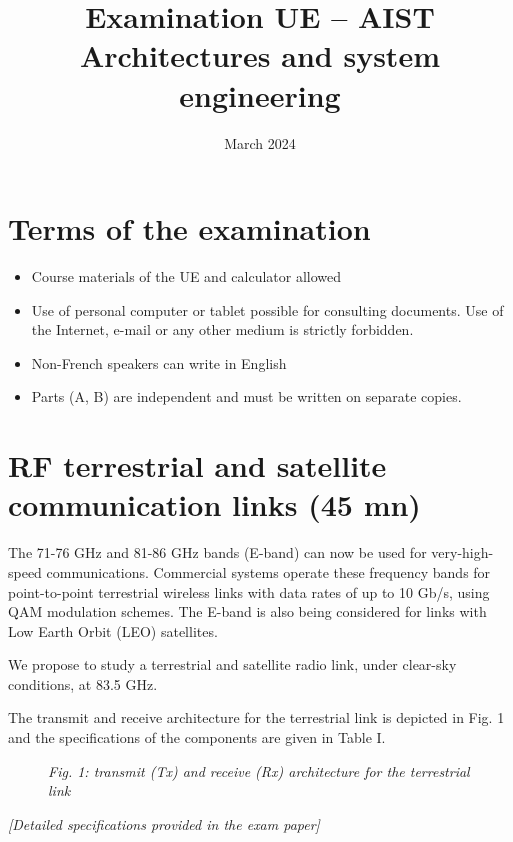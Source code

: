 \documentclass[a4paper,11pt]{article}
\title{\textbf{Examination UE -- AIST\\Architectures and system engineering}}
\author{March 2024}
\date{}
\begin{document}
\maketitle

\section*{Terms of the examination}

\begin{itemize}
    \item Course materials of the UE and calculator allowed
    \item Use of personal computer or tablet possible for consulting documents. Use of the Internet, e-mail or any other medium is strictly forbidden.
    \item Non-French speakers can write in English
    \item Parts (A, B) are independent and must be written on separate copies.
\end{itemize}

\section{RF terrestrial and satellite communication links (45 mn)}

The 71-76 GHz and 81-86 GHz bands (E-band) can now be used for very-high-speed communications. Commercial systems operate these frequency bands for point-to-point terrestrial wireless links with data rates of up to 10 Gb/s, using QAM modulation schemes. The E-band is also being considered for links with Low Earth Orbit (LEO) satellites.

We propose to study a terrestrial and satellite radio link, under clear-sky conditions, at 83.5 GHz.

The transmit and receive architecture for the terrestrial link is depicted in Fig. 1 and the specifications of the components are given in Table I.

\begin{figure}[h]
    \centering
    \textit{Fig. 1: transmit (Tx) and receive (Rx) architecture for the terrestrial link}
\end{figure}

\begin{table}[h]
\centering
\caption{Specifications of the components in the terrestrial transmission system}
\textit{[Detailed specifications provided in the exam paper]}
\end{table}
\end{document}
